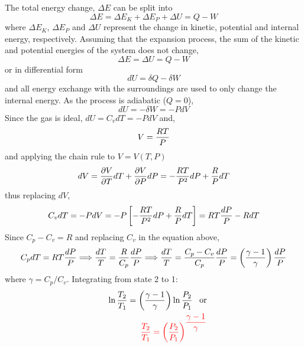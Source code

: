 \begin{enumerate}
The total energy change, $\Delta E$ can be split into
\begin{displaymath}
\Delta E = \Delta E_{K} + \Delta E_{P} + \Delta U = Q - W
\end{displaymath}
where $\Delta E_{K}$, $\Delta E_{P}$ and $\Delta U$ represent the change in kinetic, potential and internal energy, respectively. Assuming that the expansion process, the sum of the kinetic and potential energies of the system does not change,
\begin{displaymath}
\Delta E = \Delta U = Q - W
\end{displaymath}
or in differential form
\begin{displaymath}
dU = \delta Q - \delta W
\end{displaymath}
and all energy exchange with the surroundings are used to only change the internal energy. As the process is adiabatic ($Q=0$),
\begin{displaymath}
 dU = -\delta W = -P dV
\end{displaymath}
Since the gas is ideal, $dU=C_{v}dT = -PdV$ and,
\begin{displaymath}
V=\displaystyle\frac{RT}{P}
\end{displaymath}
and applying the chain rule to $V=V(T,P)$
\begin{displaymath}
dV = \displaystyle\frac{\partial V}{\partial T}dT + \displaystyle\frac{\partial V}{\partial P}dP= -\displaystyle\frac{RT}{P^{2}}dP + \frac{R}{P}dT
\end{displaymath}
 thus replacing $dV$,
\begin{displaymath}
C_{v}dT = - PdV = -P\left[-\displaystyle\frac{RT}{P^{2}}dP + \displaystyle\frac{R}{P}dT\right] = RT\displaystyle\frac{dP}{P} - RdT
\end{displaymath}
Since $C_{p}-C_{v}=R$ and replacing $C_{v}$ in the equation above,
\begin{displaymath}
C_{p}dT = RT\displaystyle\frac{dP}{P} \Longrightarrow \displaystyle\frac{dT}{T} = \displaystyle\frac{R}{C_{p}}\displaystyle\frac{dP}{P} \Longrightarrow \displaystyle\frac{dT}{T} = \displaystyle\frac{C_{p}-C_{v}}{C_{p}}\displaystyle\frac{dP}{P}=\left(\displaystyle\frac{\gamma - 1}{\gamma}\right)\displaystyle\frac{dP}{P}
\end{displaymath}
where $\gamma = C_{p}/C_{v}$. Integrating from state 2 to 1:
\begin{eqnarray}
&& \ln\displaystyle\frac{T_{2}}{T_{1}}=\left(\displaystyle\frac{\gamma - 1 }{\gamma}\right)\ln\displaystyle\frac{P_{2}}{P_{1}} \;\;\; \text{or} \nonumber \\
&& \textcolor{red}{\displaystyle\frac{T_{2}}{T_{1}} = \left(\displaystyle\frac{P_{2}}{P_{1}}\right)^{\displaystyle\frac{\gamma-1}{\gamma}}} \nonumber 
\end{eqnarray}

\medskip


\end{enumerate}
